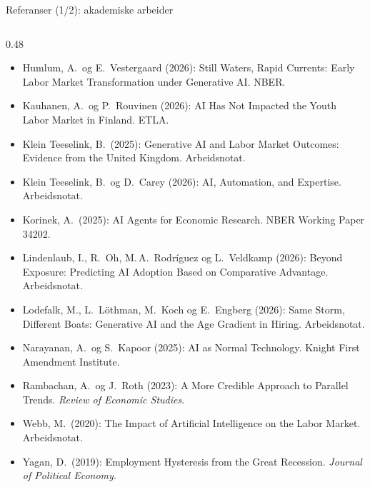 \begin{frame}{Referanser (1/2): akademiske arbeider}
\begin{columns}[T,onlytextwidth]
\begin{column}{0.48\textwidth}
\begin{itemize}
  \item Humlum, A.\ og E.\ Vestergaard (2026): Still Waters, Rapid Currents: Early Labor Market Transformation under Generative AI. NBER.
  \item Kauhanen, A.\ og P.\ Rouvinen (2026): AI Has Not Impacted the Youth Labor Market in Finland. ETLA.
  \item Klein Teeselink, B.\ (2025): Generative AI and Labor Market Outcomes: Evidence from the United Kingdom. Arbeidsnotat.
  \item Klein Teeselink, B.\ og D.\ Carey (2026): AI, Automation, and Expertise. Arbeidsnotat.
  \item Korinek, A.\ (2025): AI Agents for Economic Research. NBER Working Paper 34202.
  \item Lindenlaub, I., R.\ Oh, M.\,A.\ Rodríguez og L.\ Veldkamp (2026): Beyond Exposure: Predicting AI Adoption Based on Comparative Advantage. Arbeidsnotat.
  \item Lodefalk, M., L.\ Löthman, M.\ Koch og E.\ Engberg (2026): Same Storm, Different Boats: Generative AI and the Age Gradient in Hiring. Arbeidsnotat.
  \item Narayanan, A.\ og S.\ Kapoor (2025): AI as Normal Technology. Knight First Amendment Institute.
  \item Rambachan, A.\ og J.\ Roth (2023): A More Credible Approach to Parallel Trends. \emph{Review of Economic Studies}.
  \item Webb, M.\ (2020): The Impact of Artificial Intelligence on the Labor Market. Arbeidsnotat.
  \item Yagan, D.\ (2019): Employment Hysteresis from the Great Recession. \emph{Journal of Political Economy}.
\end{itemize}
\end{column}
\end{columns}
\end{frame}

